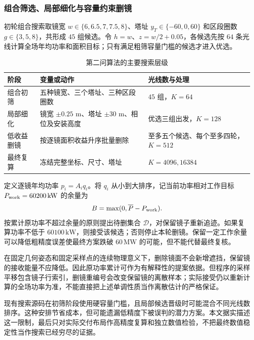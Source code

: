 \pagepart
\subsubsection{组合筛选、局部细化与容量约束删镜}
初轮组合搜索取镜宽 $w\in\{6,6.5,7,7.5,8\}$、塔址 $y_T\in\{-60,0,60\}$ 和区段圈数 $g\in\{3,5,8\}$，共形成 $45$ 组候选。令 $h=w$、$z=w/2+0.05$，各候选先按 $64$ 条光线计算全场年均功率和面积目标；只有满足粗筛容量门槛的候选才进入优选。

\begin{table}[H]\centering\small
\caption{第二问算法的主要搜索层级}
\begin{tabular}{p{26mm}p{70mm}p{45mm}}\toprule
阶段 & 变量或动作 & 光线数与处理\\\midrule
组合初筛 & 五种镜宽、三个塔址、三种区段圈数 & $45$ 组，$K=64$\\
局部细化 & 镜宽 $\pm0.25$ m、塔址 $\pm30$ m、相位及安装高度 & 优选三组出发，$K=128$\\
低收益删镜 & 按逐镜面积收益升序批量删除 & 至多五个候选、每个至多四轮，$K=512$\\
最终复算 & 冻结完整坐标、尺寸、塔址 & $K=4096,16384$\\
\bottomrule\end{tabular}\end{table}
定义逐镜年均功率 $p_i=A_iq_i$。将 $q_i$ 从小到大排序，记当前功率相对工作目标 $P_{\rm work}=60200\,\mathrm{kW}$ 的余量为
\begin{equation}
B=\max(0,\overline{P}-P_{\rm work}).
\end{equation}
按累计原功率不超过余量的原则提出待删集合 $\mathcal D$，对保留镜子重新追迹。如果复算功率不低于 $60100\,\mathrm{kW}$，则接受该候选；否则停止本轮删镜。保留一定工作余量可以降低粗精度误差使最终方案跌破 $60\,\mathrm{MW}$ 的可能，但不能代替最终复核。

在固定几何姿态和固定采样点的连续物理意义下，删除镜面不会新增遮挡，保留镜的接收能量不应降低。因此原功率累计可作为有解释性的提案依据。但程序的采样平移包含镜子行索引，删镜重编号会改变保留镜的离散样本；实际接受仍以重新计算的全场功率为准，不能直接把上述单调性质当作离散估计的严格保证。

现有搜索源码在初筛阶段使用硬容量门槛，且局部候选晋级时可能混合不同光线数排序。这种安排节省成本，但可能遗漏低精度下被误判的潜力方案。本文据实描述这一限制，最后只对实际交付布局作高精度复算和独立数值检验，不把最终数值稳定性当作搜索已经穷尽的证据。

\pagepart
